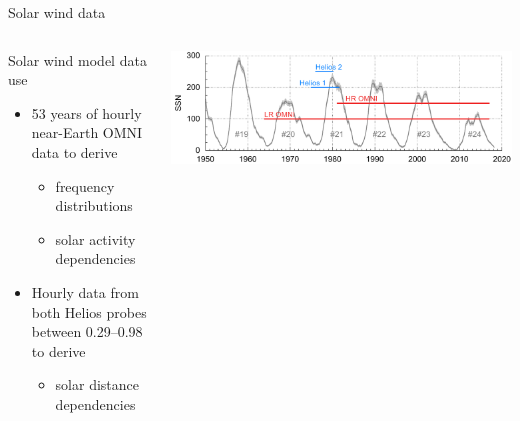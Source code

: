\begin{frame}[plain,c]{Solar wind data}{}
\begin{columns}[c]
		\begin{block}{Solar wind model data use}
			\begin{itemize}
				\item 53 years of hourly near-Earth OMNI data to derive
				\begin{itemize}
					\item frequency distributions
					\item solar activity dependencies
				\end{itemize}
				\item Hourly data from both Helios probes between \SIrange{0.29}{0.98}{\au} to derive
				\begin{itemize}
					\item solar distance dependencies
				\end{itemize}
			\end{itemize}
		\end{block}
		\vspace{5mm}
		\hspace*{-30pt}
		\includegraphics[width=1.2\textwidth]{../talk_figures/timeline_SSN_with_data_and_sc.pdf}
		
	\end{columns}
\end{frame}

